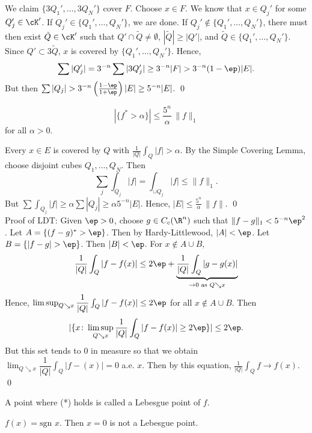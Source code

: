 We claim $\{ 3Q_1', \ldots, 3Q_N' \}$ cover $F$. Choose $x \in F$. We know that $x \in Q_j'$ for some $Q_j' \in \cK'$. If $Q_j' \in \{Q_1', \ldots, Q_N' \}$, we are done. If $Q_j' \notin \{Q_1', \ldots, Q_N' \}$, there must then exist $\tilde{Q} \in \cK'$ such that $Q' \cap \tilde{Q} \neq \emptyset$, $|\tilde{Q}| \geq |Q'|$, and $\tilde{Q} \in \{Q_1', \ldots, Q_N' \}$. Since $Q' \subset 3\tilde{Q}$, $x$ is covered by $\{Q_1', \ldots, Q_N' \}$. Hence, 
	\[
	\sum |Q_j'| = 3^{-n} \sum |3Q_j'| \geq 3^{-n} |F| > 3^{-n} (1-\ep) |E|.
	\] 
But then $\sum |Q_j| > 3^{-n} \left(\frac{1-\ep}{1+\ep}\right) |E| \geq 5^{-n} |E|$. \qed \\

	
\begin{thm}
	\[
	|\{ f^* > \alpha \}| \leq \dfrac{5^n}{\alpha} \, \|f\|_1
	\]
for all $\alpha>0$. 
\end{thm}

\pf Every $x \in E$ is covered by $Q$ with $\frac{1}{|Q|} \int_Q |f| > \alpha$. By the Simple Covering Lemma, choose disjoint cubes $Q_1,\ldots, Q_N$. Then
	\[
	\sum_j \int_{Q_j} |f| = \int_{\cup Q_j} |f| \leq \| f \|_1.
	\]
But $\sum \int_{Q_j} |f| \geq \alpha \sum |Q_j| \geq \alpha 5^{-n} |E|$. Hence, $|E| \leq \frac{5^n}{\alpha} \, \|f\|$. \qed \\




Proof of LDT: Given $\ep>0$, choose $g \in C_c(\R^n)$ such that $\| f - g \|_1< 5^{-n} \ep^2$. Let $A= \{ (f-g)^* > \ep \}$. Then by Hardy-Littlewood, $|A|<\ep$. Let $B= \{ |f-g|>\ep \}$. Then $|B|<\ep$. For $x \notin A \cup B$, 
	\[
	\dfrac{1}{|Q|} \int_Q |f-f(x)| \leq 2\ep + \underbrace{\dfrac{1}{|Q|} \int_Q |g-g(x)|}_{\to 0 \text{ as } Q \searrow x}
	\]
Hence, $\limsup_{Q \searrow x} \dfrac{1}{|Q|} \int_Q |f-f(x)| \leq 2 \ep$ for all $x \notin A \cup B$. Then 
	\[
	|\{ x \colon \limsup_{Q \searrow x} \dfrac{1}{|Q|} \int_Q |f-f(x)| \geq 2 \ep\}| \leq 2 \ep.
	\] %
But this set tends to 0 in measure so that we obtain $\lim_{Q \searrow x} \dfrac{1}{|Q|} \int_Q |f-(x)|= 0$ a.e. $x$. Then by this equation, $\frac{1}{|Q|} \int_Q f \to f(x)$. \qed \\


\begin{rem}
A point where (*) holds is called a Lebesgue point of $f$. 
\end{rem}

\begin{ex}
$f(x)= \text{sgn } x$. Then $x=0$ is not a Lebesgue point. 
\end{ex}


